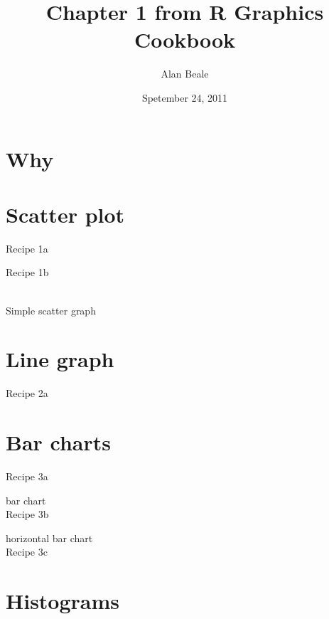 \documentclass[10pt]{article}
\title{Chapter 1 from R Graphics Cookbook }
\author{Alan Beale}
\date{Spetember 24, 2011}
\newcommand{\placeRecipe}[1]{\bigskip \noindent  \bigskip}
\newcommand{\testRecipe}[1]{\begin{figure}[!htb] \centering  \end{figure}}
\begin{document}
\sffamily 
\maketitle

\section{Why}

\section{Scatter plot}
\Large{Recipe 1a}
\placeRecipe{recipe1a}

\Large{Recipe 1b}
\testRecipe{recipe1b}
\\Simple scatter graph 
\clearpage
\section{Line graph}
\Large{Recipe 2a}
\testRecipe{recipe2a} 
\clearpage
\section{ Bar charts}
\Large{Recipe 3a}
\testRecipe{recipe3a}
bar chart\\
\Large{Recipe 3b}
\testRecipe{recipe3b}
horizontal bar chart\\
\clearpage
\Large{Recipe 3c}
\testRecipe{recipe3c}
\placeRecipe{recipe3d}
\clearpage
\section{Histograms }
\testRecipe{recipe4a}

\testRecipe{recipe4b}
\testRecipe{recipe4c}
\end{document}
